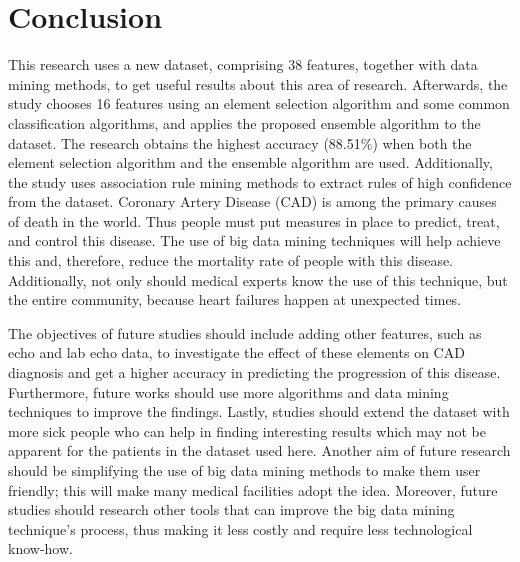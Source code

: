\documentclass[sigconf]{acmart}
\begin{document}
\section{Conclusion}
This research uses a new dataset, comprising 38 features, together with data mining methods, to get useful results about this area of research.
Afterwards, the study chooses 16 features using an element selection algorithm and some common classification algorithms, and applies the proposed ensemble algorithm to the dataset.
The research obtains the highest accuracy (88.51\%) when both the element selection algorithm and the ensemble algorithm are used.
Additionally, the study uses association rule mining methods to extract rules of high confidence from the dataset.
Coronary Artery Disease (CAD) is among the primary causes of death in the world.
Thus people must put measures in place to predict, treat, and control this disease.
The use of big data mining techniques will help achieve this and, therefore, reduce the mortality rate of people with this disease.
Additionally, not only should medical experts know the use of this technique, but the entire community, because heart failures happen at unexpected times.
\par The objectives of future studies should include adding other features, such as echo and lab echo data, to investigate the effect of these elements on CAD diagnosis and get a higher accuracy in predicting the progression of this disease.
Furthermore, future works should use more algorithms and data mining techniques to improve the findings.
Lastly, studies should extend the dataset with more sick people who can help in finding interesting results which may not be apparent for the patients in the  dataset used here.
Another aim of future research should be simplifying the use of big data mining methods to make them user friendly; this will make many medical facilities adopt the idea.
Moreover, future studies should research other tools that can improve the big data mining technique's process, thus making it less costly and require less technological know-how.
\end{document}
